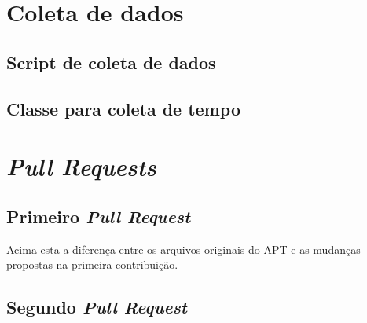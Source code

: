 \begin{apendicesenv}

\partapendices

\chapter{Coleta de dados} %
\label{cha:coleta_de_dados}

\section{Script de coleta de dados}
	

\section{Classe para coleta de tempo}
	


\chapter{\textit{Pull Requests}}
\label{cha:pull_requests}

\section{Primeiro \textit{Pull Request}}
\label{sec:primeiro_pr}
	

Acima esta a diferença entre os arquivos originais do APT e as mudanças propostas na primeira contribuição.


\section{Segundo \textit{Pull Request}}
\label{sec:segundo_pr}
	




\end{apendicesenv}
